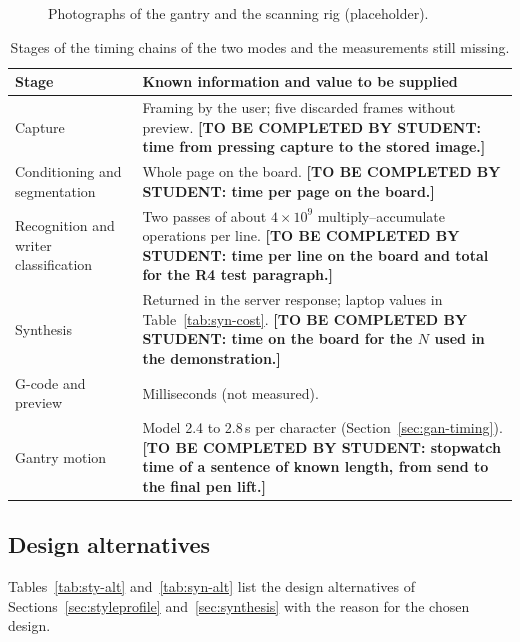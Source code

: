 \begin{figure}[!htbp]
\centering
{}
\caption{Photographs of the gantry and the scanning rig (placeholder).}
\label{fig:gan-photo}
\end{figure}

\begin{table}[!htbp]
\centering
\fontsize{9.5}{11.5}\selectfont
\begin{tabularx}{\linewidth}{|p{3.4cm}|X|}
\hline
\textbf{Stage} & \textbf{Known information and value to be supplied} \\
\hline
Capture & Framing by the user; five discarded frames without preview. \textbf{[TO BE COMPLETED BY STUDENT: time from pressing capture to the stored image.]} \\
\hline
Conditioning and segmentation & Whole page on the board. \textbf{[TO BE COMPLETED BY STUDENT: time per page on the board.]} \\
\hline
Recognition and writer classification & Two passes of about $4\times10^9$ multiply--accumulate operations per line. \textbf{[TO BE COMPLETED BY STUDENT: time per line on the board and total for the R4 test paragraph.]} \\
\hline
Synthesis & Returned in the server response; laptop values in Table~\ref{tab:syn-cost}. \textbf{[TO BE COMPLETED BY STUDENT: time on the board for the $N$ used in the demonstration.]} \\
\hline
G-code and preview & Milliseconds (not measured). \\
\hline
Gantry motion & Model 2.4 to 2.8\,s per character (Section~\ref{sec:gan-timing}). \textbf{[TO BE COMPLETED BY STUDENT: stopwatch time of a sentence of known length, from send to the final pen lift.]} \\
\hline
\end{tabularx}
\caption{Stages of the timing chains of the two modes and the measurements still missing.}
\label{tab:sys-timing}
\end{table}

\subsection{Design alternatives}

Tables~\ref{tab:sty-alt} and~\ref{tab:syn-alt} list the design alternatives of Sections~\ref{sec:styleprofile} and~\ref{sec:synthesis} with the reason for the chosen design.

